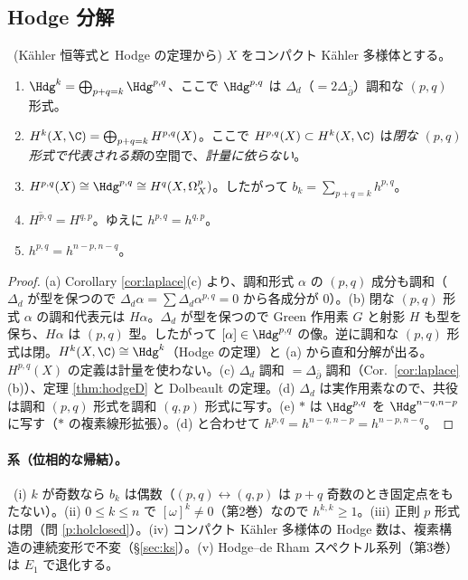 \subsection{Hodge 分解}
\begin{thm}[Hodge 分解]\label{thm:hodgedec}\tP\ (Kähler 恒等式と Hodge の定理から)
$X$ をコンパクト Kähler 多様体とする。
\begin{enumerate}
\item[(a)] $\Hdg^k=\bigoplus_{p+q=k}\Hdg^{p,q}$、ここで $\Hdg^{p,q}$ は $\Delta_d$（$=2\Delta_{\bar\partial}$）調和な $(p,q)$ 形式。
\item[(b)] $H^k(X,\C)=\bigoplus_{p+q=k}H^{p,q}(X)$。ここで $H^{p,q}(X)\subset H^k(X,\C)$ は\emph{閉な $(p,q)$ 形式で代表される類}の空間で、\emph{計量に依らない}。
\item[(c)] $H^{p,q}(X)\cong\Hdg^{p,q}\cong H^q(X,\Omega^p_X)$。したがって $b_k=\sum_{p+q=k}h^{p,q}$。
\item[(d)] $\overline{H^{p,q}}=H^{q,p}$。ゆえに $h^{p,q}=h^{q,p}$。
\item[(e)] $h^{p,q}=h^{n-p,n-q}$。
\end{enumerate}
\end{thm}
\begin{proof}
(a) Corollary \ref{cor:laplace}(c) より、調和形式 $\alpha$ の $(p,q)$ 成分も調和（$\Delta_d$ が型を保つので $\Delta_d\alpha=\sum\Delta_d\alpha^{p,q}=0$ から各成分が $0$）。(b) 閉な $(p,q)$ 形式 $\alpha$ の調和代表元は $H\alpha$。$\Delta_d$ が型を保つので Green 作用素 $G$ と射影 $H$ も型を保ち、$H\alpha$ は $(p,q)$ 型。したがって $[\alpha]\in\Hdg^{p,q}$ の像。逆に調和な $(p,q)$ 形式は閉。$H^k(X,\C)\cong\Hdg^k$（Hodge の定理）と (a) から直和分解が出る。$H^{p,q}(X)$ の定義は計量を使わない。(c) $\Delta_d$ 調和 $=\Delta_{\bar\partial}$ 調和（Cor.\ \ref{cor:laplace}(b)）、定理 \ref{thm:hodgeD} と Dolbeault の定理。(d) $\Delta_d$ は実作用素なので、共役は調和 $(p,q)$ 形式を調和 $(q,p)$ 形式に写す。(e) $\ast$ は $\Hdg^{p,q}$ を $\Hdg^{n-q,n-p}$ に写す（$\ast$ の複素線形拡張）。(d) と合わせて $h^{p,q}=h^{n-q,n-p}=h^{n-p,n-q}$。
\end{proof}
\paragraph{系（位相的な帰結）。}\tP\ (i) $k$ が奇数なら $b_k$ は偶数（$(p,q)\leftrightarrow(q,p)$ は $p+q$ 奇数のとき固定点をもたない）。(ii) $0\le k\le n$ で $[\omega]^k\neq0$（第2巻）なので $h^{k,k}\ge1$。(iii) 正則 $p$ 形式は閉（問 \ref{p:holclosed}）。(iv) コンパクト Kähler 多様体の Hodge 数は、複素構造の連続変形で不変（\S\ref{sec:ks}）。(v) Hodge--de Rham スペクトル系列（第3巻）は $E_1$ で退化する\tC。

